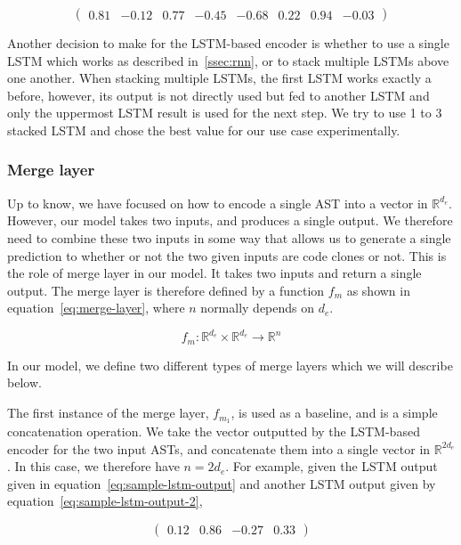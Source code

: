 \begin{equation}
  \label{eq:sample-bilstm-output}
  \begin{pmatrix}
    0.81 & -0.12 & 0.77 & -0.45 & -0.68 & 0.22 & 0.94 & -0.03
  \end{pmatrix}
\end{equation}

Another decision to make for the LSTM-based encoder is whether to use a single
LSTM which works as described in~\ref{ssec:rnn}, or to stack multiple LSTMs
above one another. When stacking multiple LSTMs, the first LSTM works exactly a
before, however, its output is not directly used but fed to another LSTM and
only the uppermost LSTM result is used for the next step. We try to use 1 to 3
stacked LSTM and chose the best value for our use case experimentally.
%
\subsubsection{\label{sssec:merge-layer}Merge layer}
Up to know, we have focused on how to encode a single AST into a vector in
$\mathbb{R}^{d_e}$. However, our model takes two inputs, and produces a single
output. We therefore need to combine these two inputs in some way that allows us
to generate a single prediction to whether or not the two given inputs are
code clones or not. This is the role of merge layer in our model. It takes two
inputs and return a single output. The merge layer is therefore defined by a
function $f_m$ as shown in equation~\ref{eq:merge-layer}, where $n$ normally
depends on $d_e$.

\begin{equation}
  \label{eq:merge-layer}
  f_m : \mathbb{R}^{d_e} \times \mathbb{R}^{d_e} \rightarrow \mathbb{R}^{n}
\end{equation}

In our model, we define two different types of merge layers which we will
describe below.

The first instance of the merge layer, $f_{m_1}$, is used as a baseline, and is a simple
concatenation operation. We take the vector outputted by the LSTM-based encoder
for the two input ASTs, and concatenate them into a single vector in
$\mathbb{R}^{2d_e}$. In this case, we therefore have $n = 2d_e$.
For example, given the LSTM output given in equation~\ref{eq:sample-lstm-output}
and another LSTM output given by equation~\ref{eq:sample-lstm-output-2},

\begin{equation}
  \label{eq:sample-lstm-output-2}
  \begin{pmatrix}0.12 & 0.86 & -0.27 & 0.33\end{pmatrix}
\end{equation}

